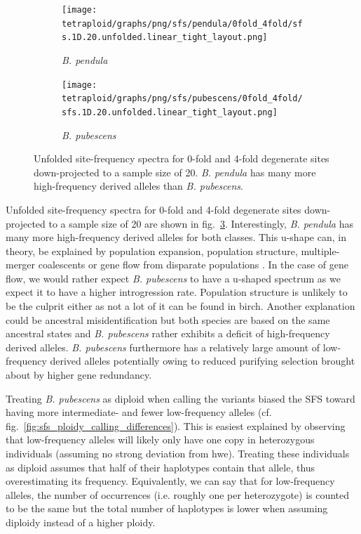 \documentclass[hidelinks,11pt]{article}
\newcommand{\pendula}{\textit{B. pendula}}
\newcommand{\pubescens}{\textit{B. pubescens}}
\begin{document}
{    \begin{figure}[ht]
        \centering
        \begin{subfigure}[b]{0.49\textwidth}
            \centering
            \texttt{[image: tetraploid/graphs/png/sfs/pendula/0fold\_4fold/sfs.1D.20.unfolded.linear\_tight\_layout.png]}
            \caption{\pendula{}}
            \label{fig:sfs_1d_pendula}
        \end{subfigure}
        \hfill
        \begin{subfigure}[b]{0.49\textwidth}
            \centering
            \texttt{[image: tetraploid/graphs/png/sfs/pubescens/0fold\_4fold/sfs.1D.20.unfolded.linear\_tight\_layout.png]}
            \caption{\pubescens{}}
            \label{fig:sfs_1d_pubescens}
        \end{subfigure}
        \caption{Unfolded site-frequency spectra for 0-fold and 4-fold degenerate sites down-projected to a sample size of 20. \pendula{} has many more high-frequency derived alleles than \pubescens{}.}
        \label{fig:sfs_1d}
    \end{figure}

    Unfolded site-frequency spectra for 0-fold and 4-fold degenerate sites down-projected to a sample size of 20 are shown in fig.~\ref{fig:sfs_1d}. Interestingly, \pendula{} has many more high-frequency derived alleles for both classes. This u-shape can, in theory, be explained by population expansion, population structure, multiple-merger coalescents or gene flow from disparate populations \cite{u-shape-gene-flow}. In the case of gene flow, we would rather expect \pubescens{} to have a u-shaped spectrum as we expect it to have a higher introgression rate. Population structure is unlikely to be the culprit either as not a lot of it can be found in birch. Another explanation could be ancestral misidentification but both species are based on the same ancestral states and \pubescens{} rather exhibits a deficit of high-frequency derived alleles. \pubescens{} furthermore has a relatively large amount of low-frequency derived alleles potentially owing to reduced purifying selection brought about by higher gene redundancy.

    Treating \pubescens{} as diploid when calling the variants biased the SFS toward having more intermediate- and fewer low-frequency alleles (cf. fig.~\ref{fig:sfs_ploidy_calling_differences}). This is easiest explained by observing that low-frequency alleles will likely only have one copy in heterozygous individuals (assuming no strong deviation from \acrshort{hwe}). Treating these individuals as diploid assumes that half of their haplotypes contain that allele, thus overestimating its frequency. Equivalently, we can say that for low-frequency alleles, the number of occurrences (i.e. roughly one per heterozygote) is counted to be the same but the total number of haplotypes is lower when assuming diploidy instead of a higher ploidy.

}
\end{document}

